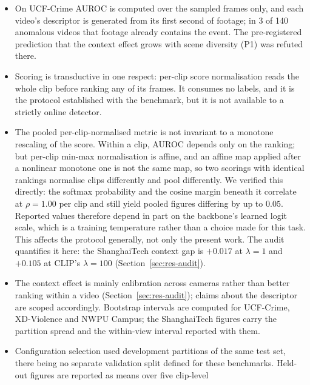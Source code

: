 \documentclass[a4paper,fleqn]{cas-sc}
\begin{document}
\begin{itemize}
        interval of $[0.756, 0.877]$. Both sample every sixteenth frame, but
        whether LAVAD computes AUROC over the sampled frames is not stated.
  \item On UCF-Crime AUROC is computed over the sampled frames only, and each
        video's descriptor is generated from its first second of
        footage; in 3 of 140 anomalous videos that footage already contains the
        event. The pre-registered prediction that the context effect grows with
        scene diversity (P1) was refuted there.
  \item Scoring is transductive in one respect: per-clip score normalisation
        reads the whole clip before ranking any of its frames. It consumes no
        labels, and it is the protocol established with the benchmark, but it
        is not available to a strictly online detector.
  \item The pooled per-clip-normalised metric is not invariant to a monotone
        rescaling of the score. Within a clip, AUROC depends only on the
        ranking; but per-clip min-max normalisation is affine, and an affine map
        applied after a nonlinear monotone one is not the same map, so two
        scorings with identical rankings normalise clips differently and pool
        differently. We verified this directly: the softmax probability and the
        cosine margin beneath it correlate at $\rho = 1.00$ per clip and still
        yield pooled figures differing by up to $0.05$. Reported values
        therefore depend in part on the backbone's learned logit scale, which is
        a training temperature rather than a choice made for this task. This
        affects the protocol generally, not only the present work. The audit
        quantifies it here: the ShanghaiTech context gap is $+0.017$ at
        $\lambda{=}1$ and $+0.105$ at CLIP's $\lambda{=}100$
        (Section~\ref{sec:res-audit}).
  \item The context effect is mainly calibration across cameras rather than
        better ranking within a video (Section~\ref{sec:res-audit}); claims about
        the descriptor are scoped accordingly. Bootstrap intervals are computed for UCF-Crime, XD-Violence and NWPU Campus; the ShanghaiTech figures carry the partition spread
        and the within-view interval reported with them.
  \item Configuration selection used development partitions of the same test
        set, there being no separate validation split defined for these
        benchmarks. Held-out figures are reported as means over five clip-level

\end{itemize}
\end{document}
